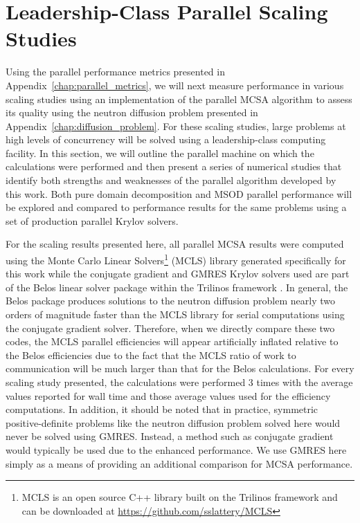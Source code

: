 \clearpage

\section{Leadership-Class Parallel Scaling Studies\ }
\label{sec:leadership_scaling_studies}
Using the parallel performance metrics presented in
Appendix~\ref{chap:parallel_metrics}, we will next measure performance
in various scaling studies using an implementation of the parallel
MCSA algorithm to assess its quality using the neutron diffusion
problem presented in Appendix~\ref{chap:diffusion_problem}. For these
scaling studies, large problems at high levels of concurrency will be
solved using a leadership-class computing facility. In this section,
we will outline the parallel machine on which the calculations were
performed and then present a series of numerical studies that identify
both strengths and weaknesses of the parallel algorithm developed by
this work. Both pure domain decomposition and MSOD parallel
performance will be explored and compared to performance results for
the same problems using a set of production parallel Krylov solvers.

For the scaling results presented here, all parallel MCSA results were
computed using the Monte Carlo Linear Solvers\footnote{MCLS is an open
  source C++ library built on the Trilinos framework and can be
  downloaded at \url{https://github.com/sslattery/MCLS}} (MCLS)
library generated specifically for this work while the conjugate
gradient and GMRES Krylov solvers used are part of the Belos linear
solver package within the Trilinos framework
\cite{heroux_overview_2005}. In general, the Belos package produces
solutions to the neutron diffusion problem nearly two orders of
magnitude faster than the MCLS library for serial computations using
the conjugate gradient solver. Therefore, when we directly compare
these two codes, the MCLS parallel efficiencies will appear
artificially inflated relative to the Belos efficiencies due to the
fact that the MCLS ratio of work to communication will be much larger
than that for the Belos calculations. For every scaling study
presented, the calculations were performed 3 times with the average
values reported for wall time and those average values used for the
efficiency computations. In addition, it should be noted that in
practice, symmetric positive-definite problems like the neutron
diffusion problem solved here would never be solved using
GMRES. Instead, a method such as conjugate gradient would typically be
used due to the enhanced performance. We use GMRES here simply as a
means of providing an additional comparison for MCSA performance.

